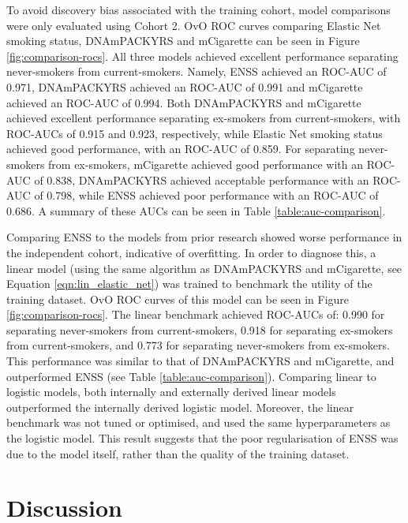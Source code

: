 \documentclass{article} %
\begin{document}
To avoid discovery bias associated with the training cohort, model comparisons were only evaluated using Cohort 2. OvO ROC curves comparing Elastic Net smoking status, DNAmPACKYRS and mCigarette can be seen in Figure \ref{fig:comparison-rocs}. All three models achieved excellent performance separating never-smokers from current-smokers. Namely, ENSS achieved an ROC-AUC of 0.971, DNAmPACKYRS achieved an ROC-AUC of 0.991 and mCigarette achieved an ROC-AUC of 0.994. Both DNAmPACKYRS and mCigarette achieved excellent performance separating ex-smokers from current-smokers, with ROC-AUCs of 0.915 and 0.923, respectively, while Elastic Net smoking status achieved good performance, with an ROC-AUC of 0.859. For separating never-smokers from ex-smokers, mCigarette achieved good performance with an ROC-AUC of 0.838, DNAmPACKYRS achieved acceptable performance with an ROC-AUC of 0.798, while ENSS achieved poor performance with an ROC-AUC of 0.686. A summary of these AUCs can be seen in Table \ref{table:auc-comparison}.

Comparing ENSS to the models from prior research showed worse performance in the independent cohort, indicative of overfitting. In order to diagnose this, a linear model (using the same algorithm as DNAmPACKYRS and mCigarette, see Equation \ref{eqn:lin_elastic_net}) was trained to benchmark the utility of the training dataset. OvO ROC curves of this model can be seen in Figure \ref{fig:comparison-rocs}. The linear benchmark achieved ROC-AUCs of: 0.990 for separating never-smokers from current-smokers, 0.918 for separating ex-smokers from current-smokers, and 0.773 for separating never-smokers from ex-smokers. This performance was similar to that of DNAmPACKYRS and mCigarette, and outperformed ENSS (see Table \ref{table:auc-comparison}). Comparing linear to logistic models, both internally and externally derived linear models outperformed the internally derived logistic model. Moreover, the linear benchmark was not tuned or optimised, and used the same hyperparameters as the logistic model. This result suggests that the poor regularisation of ENSS was due to the model itself, rather than the quality of the training dataset.

\newpage
\section{Discussion}
\end{document}
